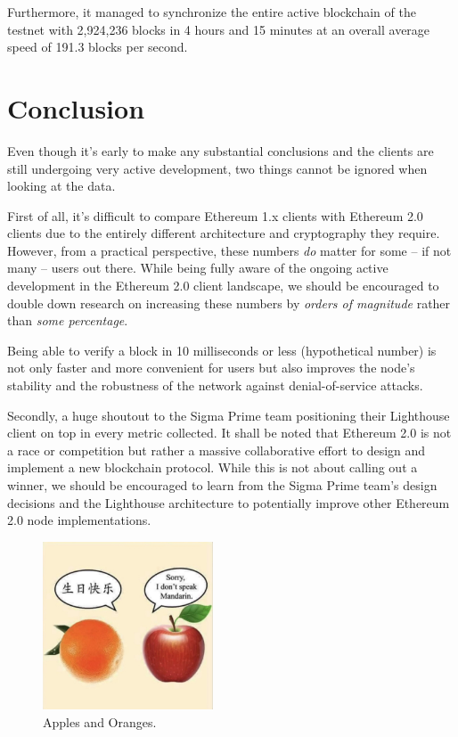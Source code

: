 \documentclass[twoside,twocolumn]{article}
\begin{document}
Furthermore, it managed to synchronize the entire active blockchain of the testnet with 2,924,236 blocks in 4 hours and 15 minutes at an overall average speed of 191.3 blocks per second.\par

\section{Conclusion}
Even though it's early to make any substantial conclusions and the clients are still undergoing very active development, two things cannot be ignored when looking at the data.

First of all, it's difficult to compare Ethereum 1.x clients with Ethereum 2.0 clients due to the entirely different architecture and cryptography they require. However, from a practical perspective, these numbers \textit{do} matter for some -- if not many -- users out there. While being fully aware of the ongoing active development in the Ethereum 2.0 client landscape, we should be encouraged to double down research on increasing these numbers by \textit{orders of magnitude} rather than \textit{some percentage}.\par

Being able to verify a block in 10 milliseconds or less (hypothetical number) is not only faster and more convenient for users but also improves the node's stability and the robustness of the network against denial-of-service attacks.\par

Secondly, a huge shoutout to the Sigma Prime team positioning their Lighthouse client on top in every metric collected. It shall be noted that Ethereum 2.0 is not a race or competition but rather a massive collaborative effort to design and implement a new blockchain protocol. While this is not about calling out a winner, we should be encouraged to learn from the Sigma Prime team's design decisions and the Lighthouse architecture to potentially improve other Ethereum 2.0 node implementations.\par

\begin{figure}[t]
	\centering
	\includegraphics[width=0.45\textwidth]{../res/vegies.png}
	\caption{Apples and Oranges.}
	\label{img:meme}
\end{figure}
\end{document}
